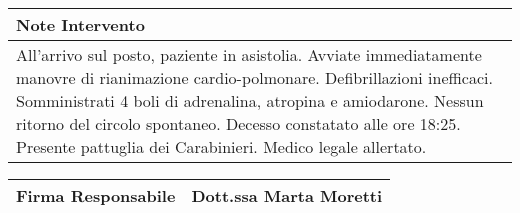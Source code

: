 \documentclass[a4paper]{article}
\newcommand{\graycell}[1]{\cellcolor[gray]{0.85}\textbf{#1}}      %
\begin{document}
\vspace{0.5cm}

\begin{tabular}{|L{1.0\textwidth}|}
\hline
\graycell{Note Intervento} \\ \hline
All’arrivo sul posto, paziente in asistolia. Avviate immediatamente manovre di rianimazione cardio-polmonare. Defibrillazioni inefficaci. Somministrati 4 boli di adrenalina, atropina e amiodarone. Nessun ritorno del circolo spontaneo. Decesso constatato alle ore 18:25. Presente pattuglia dei Carabinieri. Medico legale allertato. \\ \hline
\end{tabular}

\vspace{0.5cm}

\begin{tabular}{|L{0.5\textwidth}|L{0.5\textwidth}|}
\hline
\graycell{Firma Responsabile} & Dott.ssa Marta Moretti \\ \hline
\end{tabular}
\end{document}
